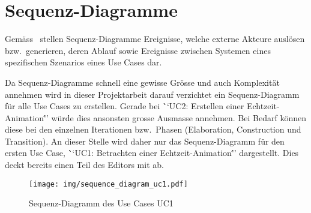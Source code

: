 
\section{Sequenz-Diagramme}
\label{sec:sequence-diagrams}

Gemäss~\cite{larman_applying_2004} stellen Sequenz-Diagramme Ereignisse, welche
externe Akteure auslösen bzw.\ generieren, deren Ablauf sowie Ereignisse
zwischen Systemen eines spezifischen Szenarios eines Use Cases dar.

Da Sequenz-Diagramme schnell eine gewisse Grösse und auch Komplexität annehmen
wird in dieser Projektarbeit darauf verzichtet ein Sequenz-Diagramm für alle
Use Cases zu erstellen. Gerade bei \```UC2: Erstellen einer
Echtzeit-Animation\''' würde dies ansonsten grosse Ausmasse annehmen. Bei
Bedarf können diese bei den einzelnen Iterationen bzw.\ Phasen (Elaboration,
Construction und Transition). An dieser Stelle wird daher nur das
Sequenz-Diagramm für den ersten Use Case, \```UC1: Betrachten einer
Echtzeit-Animation\''' dargestellt. Dies deckt bereits einen Teil des Editors
mit ab.

\begin{figure}[H]
    \centering
    \texttt{[image: img/sequence\_diagram\_uc1.pdf]}
    \caption{Sequenz-Diagramm  des Use Cases UC1
        \protect\footnotemark}\label{fig:package-diagram:editor}
\end{figure}

